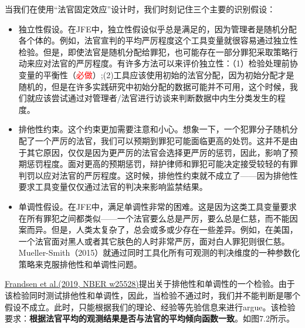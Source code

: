 \documentclass[cn,12pt,math=newtx,citestyle=gb7714-2015,bibstyle=gb7714-2015]{elegantbook}
\begin{document}
	当我们在使用“法官固定效应”设计时，我们时刻记住三个主要的识别假设：
	
	\begin{itemize}
		\item 独立性假设。在JFE中，独立性假设似乎总是满足的，因为管理者是随机分配各个体的。例如，法官宣判的平均严厉程度这个工具变量就很容易通过独立性检验。但是，即使法官是随机分配给罪犯，也可能存在一部分罪犯采取策略行动来应对法官的严厉程度。有许多方法可以来评价独立性：（1）检验处理前协变量的平衡性（\textcolor{red}{必做}）;(2)工具应该使用初始的法官分配，因为初始分配才是随机的，但是在许多实践研究中初始分配的数据可能并不可用，这个时候，我们就应该尝试通过对管理者/法官进行访谈来判断数据中内生分类发生的程度。
		\item 排他性约束。这个约束更加需要注意和小心。想象一下，一个犯罪分子随机分配了一个严厉的法官，我们可以预期到罪犯可能面临更高的处罚。这并不是由于其它原因，仅仅是因为更严厉的法官会选择更严厉的惩罚，因此，影响了预期惩罚程度。面对更高的预期惩罚，辩护律师和罪犯可能决定接受较轻的有罪判罚以应对法官的严厉程度。这时候，排他性约束就不成立了——因为排他性要求工具变量仅仅通过法官的判决来影响监禁结果。
		\item 单调性假设。在JFE中，满足单调性非常的困难。这是因为这类工具变量要求在所有罪犯之间都类似——一个法官要么总是严厉，要么总是仁慈，而不能因案而异。但是，人类太复杂了，总会或多或少存在一些差异。例如，在美国，一个法官面对黑人或者其它肤色的人时非常严厉，面对白人罪犯则很仁慈。Mueller-Smith（2015）就通过同时工具化所有可观测的判决维度的一种参数化策略来克服排他性和单调性问题。
	\end{itemize}
	
	\href{https://www.nber.org/system/files/working_papers/w25528/w25528.pdf}{Frandsen et al.(2019, NBER w25528)}提出关于排他性和单调性的一个检验。由于该检验同时测试排他性和单调性，因此，当检验不通过时，我们并不能判断是哪个假设不成立。此时，只能根据我们的理论、经验等先验信息来进行argue。该检验要求：\textbf{根据法官平均的观测结果是否与法官的平均倾向函数一致}。如图7.2所示。
	
\end{document}
